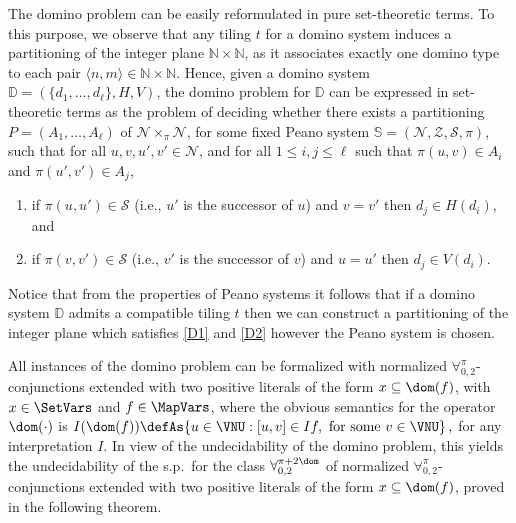 \documentclass[submission,copyright,creativecommons]{eptcs}
\newcommand{\Lang}{\ensuremath{\mathbf{\forall}^{\pi}_{0,2}}\xspace}
\newcommand{\inter}{I}
\newcommand{\Langdom}{\ensuremath{\mathbf{\forall}^{\pi +2 \dom}_{0,2}}\xspace}
\newcommand{\nat}{\mathbb{N}}
\newcommand{\dominoSys}{\mathbb{D}}
\newcommand{\peanSys}{\mathbb{S}}
\newcommand{\peanN}{\mathcal{N}}
\newcommand{\peanZ}{\mathcal{Z}}
\newcommand{\peanS}{\mathcal{S}}
\newcommand{\Partition}{P}
\newcommand{\partn}{A}
\newcommand{\mvx}{f}
\begin{document}
The domino problem can be easily reformulated in pure set-theoretic
terms.  To this purpose, we observe that any tiling $t$ for a domino
system induces a partitioning of the integer plane $\nat \times \nat$,
as it associates exactly one domino type to each pair $\langle
n,m\rangle \in \nat \times \nat$.  Hence, given a domino system
$\dominoSys=(\{d_1, \ldots, d_\ell\},H,V)$, the domino problem for
$\dominoSys$ can be expressed in set-theoretic terms as the problem of
deciding whether there exists a partitioning $\Partition=(\partn_1,
\ldots, \partn_\ell)$ of $\peanN \times_{\pi} \peanN$, for some fixed
Peano system $\peanSys=(\peanN, \peanZ, \peanS, \pi)$, such that for
all $u,v,u',v' \in \peanN$, and for all $1 \leq i,j \leq \ell$ such
that $\pi(u,v) \in \partn_i$ and $\pi(u',v') \in \partn_j$,
\begin{enumerate}[label=\textbf{(D\arabic*)}]
\item\label{D1} if $\pi(u,u') \in \peanS$ (i.e., $u'$ is the successor
of $u$) and $v=v'$ then $d_j \in H(d_i)$, and

\item\label{D2} if $\pi(v,v') \in \peanS$ (i.e., $v'$ is the successor
of $v$) and $u=u'$ then $d_j \in V(d_i)$.
\end{enumerate}

Notice that from the properties of Peano systems it follows that if a
domino system $\dominoSys$ admits a compatible tiling $t$ then we can
construct a partitioning of the integer plane which satisfies \ref{D1}
and \ref{D2} however the Peano system is chosen.



All instances of the domino problem can be formalized with normalized
\Lang-conjunctions extended with two positive literals of the form $x
\subseteq \dom(\mvx)$, with $x \in \SetVars$ and $\mvx \in \MapVars$,
where the obvious semantics for the operator $\dom(\cdot)$ is 
$
\inter (\dom(\mvx)) \defAs  \{u \in \VNU : [u,v] \in \inter \mvx,
\text{ for some } v \in \VNU\}\,,
$
for any interpretation $\inter$.  In view of the undecidability of the
domino problem, this yields the undecidability of the s.p.\ for the
class $\Langdom$ of normalized \Lang-conjunctions extended with two
positive literals of the form $x \subseteq \dom(\mvx)$, proved in the
following theorem.
\end{document}
